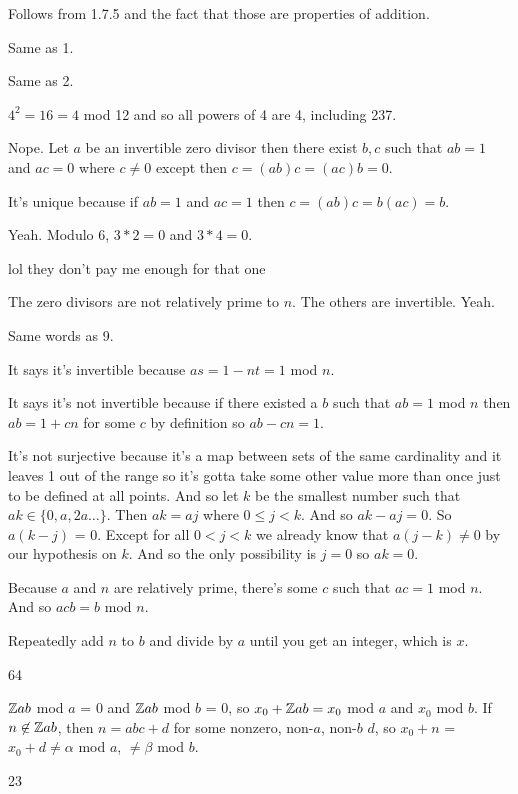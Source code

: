 \documentclass[11pt, oneside]{article}   	%
\begin{document}
\be
\item Follows from 1.7.5 and the fact that those are properties of addition.
\item Same as 1.
\item Same as 2.
\item $4^2 = 16 = 4$ mod 12 and so all powers of 4 are 4, including 237.
\item Nope. Let $a$ be an invertible zero divisor then there exist $b, c$ such that $ab = 1$ and $ac = 0$ where $c \not=0$ except then $c = (ab)c = (ac)b = 0$.
\item It's unique because if $ab = 1$ and $ac = 1$ then $c = (ab)c = b(ac) = b$.
\item Yeah. Modulo 6, $3*2 = 0$ and $3 * 4 = 0$. 
\item lol they don't pay me enough for that one
\item The zero divisors are not relatively prime to $n$. The others are invertible. Yeah.
\item Same words as 9.
\item It says it's invertible because $as = 1-nt = 1$ mod $n$.
\item It says it's not invertible because if there existed a $b$ such that $ab = 1$ mod $n$ then $ab = 1 + cn$ for some $c$ by definition so $ab - cn = 1$.
\item It's not surjective because it's a map between sets of the same cardinality and it leaves 1 out of the range so it's gotta take some other value more than once just to be defined at all points. And so let $k$ be the smallest number such that $ak \in \{0, a, 2a\ldots\}$. Then $ak = aj$ where $0 \le j < k$. And so $ak - aj = 0$. So $a(k-j)$ = 0. Except for all $0 < j < k$ we already know that $a(j-k) \not = 0$ by our hypothesis on $k$. And so the only possibility is $j=0$ so $ak = 0$. 
\item \be \item Because $a$ and $n$ are relatively prime, there's some $c$ such that $ac = 1$ mod $n$. And so $acb = b$ mod $n$.
\item Repeatedly add $n$ to $b$ and divide by $a$ until you get an integer, which is $x$.
\item 64
\ee 
\item $\mathbb{Z} ab$ mod $a$ = 0 and $\mathbb{Z} ab$ mod $b$ = 0, so $x_0 + \mathbb{Z} ab = x_0$ mod $a$ and $x_0$ mod $b$. If $n \not \in \mathbb{Z} ab$, then $n = abc + d$ for some nonzero, non-$a$, non-$b$ $d$, so $x_0 + n$ = $x_0 + d \not = \alpha$ mod $a$, $\not = \beta$ mod $b$.
\item 23
\ee
\end{document}
